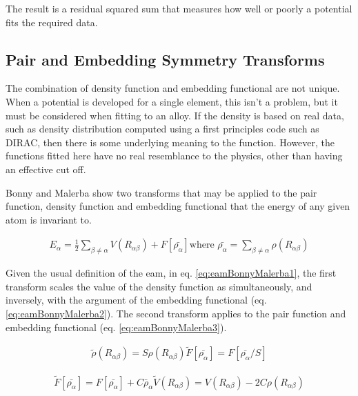 The result is a residual squared sum that measures how well or poorly a potential fits the required data.


\subsection{Pair and Embedding Symmetry Transforms}
\label{section:pairembeddingsym}

The combination of density function and embedding functional are not unique.  When a potential is developed for a single element, this isn't a problem, but it must be considered when fitting to an alloy.  If the density is based on real data, such as density distribution computed using a first principles code such as DIRAC, then there is some underlying meaning to the function.  However, the functions fitted here have no real resemblance to the physics, other than having an effective cut off.  

Bonny and Malerba\cite{bonnymalerba} show two transforms that may be applied to the pair function, density function and embedding functional that the energy of any given atom is invariant to.

\begin{equation}
\begin{split}
E_{\alpha} = \frac{1}{2} \sum_{\beta \neq \alpha} V(R_{\alpha \beta}) + F[\bar{\rho_{\alpha}}]
\text{where } \bar{\rho_{\alpha}} = \sum_{\beta \neq \alpha} \rho(R_{\alpha \beta})
\end{split}
\label{eq:eamBonnyMalerba1}
\end{equation}

Given the usual definition of the \acrshort{eam}, in eq. \ref{eq:eamBonnyMalerba1}, the first transform scales the value of the density function as simultaneously, and inversely, with the argument of the embedding functional (eq. \ref{eq:eamBonnyMalerba2}).  The second transform applies to the pair function and embedding functional (eq. \ref{eq:eamBonnyMalerba3}).

\begin{equation}
\begin{split}
\tilde{\rho}(R_{\alpha \beta}) = S \rho(R_{\alpha \beta})
\tilde{F}[\bar{\rho_{\alpha}}] = F[\bar{\rho_{\alpha}}/S]
\end{split}
\label{eq:eamBonnyMalerba2}
\end{equation}

\begin{equation}
\begin{split}
\tilde{F}[\bar{\rho_{\alpha}}] = F[\bar{\rho_{\alpha}}] + C \bar{\rho}_{\alpha}
\tilde{V}(R_{\alpha \beta}) = V(R_{\alpha \beta}) - 2 C \rho(R_{\alpha \beta})
\end{split}
\label{eq:eamBonnyMalerba3}
\end{equation}


